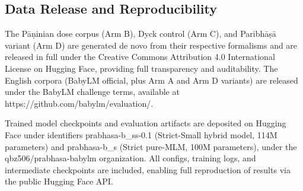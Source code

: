 \subsection{Data Release and Reproducibility}

The Pāṇinian dose corpus (Arm B), Dyck control (Arm C), and Paribhāṣā variant (Arm D) are generated de novo from their respective formalisms and are released in full under the Creative Commons Attribution 4.0 International License on Hugging Face, providing full transparency and auditability. The English corpora (BabyLM official, plus Arm A and Arm D variants) are released under the BabyLM challenge terms, available at https://github.com/babylm/evaluation/.

Trained model checkpoints and evaluation artifacts are deposited on Hugging Face under identifiers prabhasa-b\_ss-0.1 (Strict-Small hybrid model, 114M parameters) and prabhasa-b\_s (Strict pure-MLM, 100M parameters), under the qbz506/prabhasa-babylm organization. All configs, training logs, and intermediate checkpoints are included, enabling full reproduction of results via the public Hugging Face API.

